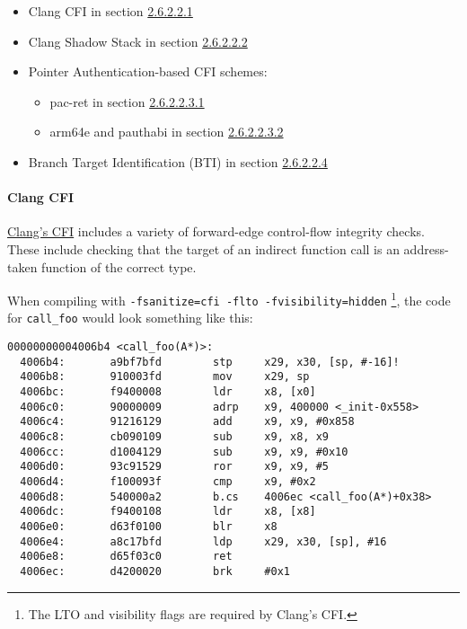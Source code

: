 \documentclass[
  a4paper,
]{report}
\providecommand{\tightlist}{%
  \setlength{\itemsep}{0pt}\setlength{\parskip}{0pt}}
\begin{document}
\begin{itemize}
\tightlist
\item
  Clang CFI in section \hyperref[sec:clang-cfi]{2.6.2.2.1}
\item
  Clang Shadow Stack in section
  \hyperref[sec:clang-shadow-stack]{2.6.2.2.2}
\item
  Pointer Authentication-based CFI schemes:

  \begin{itemize}
  \tightlist
  \item
    pac-ret in section \hyperref[sec:pac-ret]{2.6.2.2.3.1}
  \item
    arm64e and pauthabi in section
    \hyperref[sec:arm64e-pauthabi]{2.6.2.2.3.2}
  \end{itemize}
\item
  Branch Target Identification (BTI) in section
  \hyperref[sec:bti]{2.6.2.2.4}
\end{itemize}

\paragraph{Clang CFI}\label{sec:clang-cfi}

\href{https://clang.llvm.org/docs/ControlFlowIntegrity.html}{Clang's
CFI} includes a variety of forward-edge control-flow integrity checks.
These include checking that the target of an indirect function call is
an address-taken function of the correct type.

When compiling with \texttt{-fsanitize=cfi\ -flto\ -fvisibility=hidden}
\footnote{The LTO and visibility flags are required by Clang's CFI.},
the code for \texttt{call\_foo} would look something like this:

\begin{verbatim}
00000000004006b4 <call_foo(A*)>:
  4006b4:       a9bf7bfd        stp     x29, x30, [sp, #-16]!
  4006b8:       910003fd        mov     x29, sp
  4006bc:       f9400008        ldr     x8, [x0]
  4006c0:       90000009        adrp    x9, 400000 <_init-0x558>
  4006c4:       91216129        add     x9, x9, #0x858
  4006c8:       cb090109        sub     x9, x8, x9
  4006cc:       d1004129        sub     x9, x9, #0x10
  4006d0:       93c91529        ror     x9, x9, #5
  4006d4:       f100093f        cmp     x9, #0x2
  4006d8:       540000a2        b.cs    4006ec <call_foo(A*)+0x38>
  4006dc:       f9400108        ldr     x8, [x8]
  4006e0:       d63f0100        blr     x8
  4006e4:       a8c17bfd        ldp     x29, x30, [sp], #16
  4006e8:       d65f03c0        ret
  4006ec:       d4200020        brk     #0x1
\end{verbatim}
\end{document}
